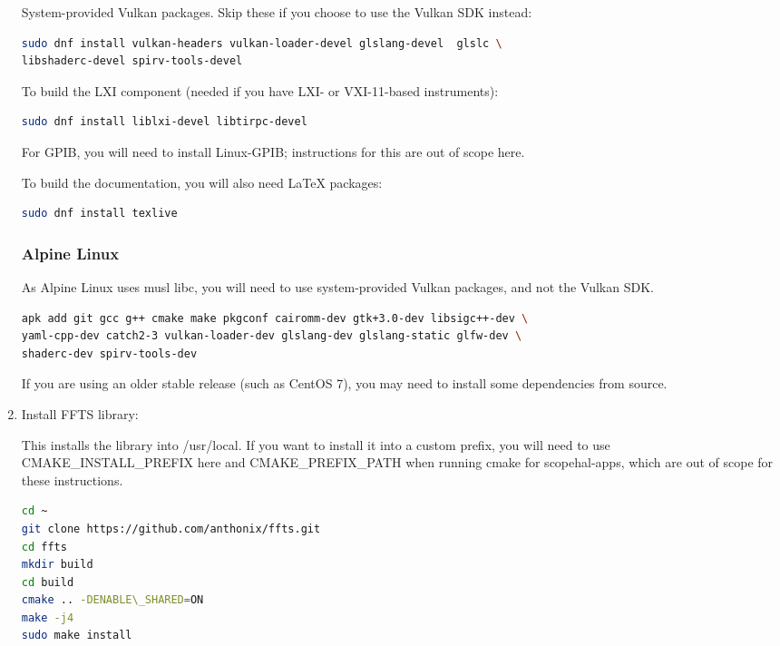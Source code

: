 \begin{enumerate}
System-provided Vulkan packages. Skip these if you choose to use the Vulkan SDK instead:
\begin{lstlisting}[language=sh, numbers=none]
sudo dnf install vulkan-headers vulkan-loader-devel glslang-devel  glslc \
libshaderc-devel spirv-tools-devel
\end{lstlisting}

To build the LXI component (needed if you have LXI- or VXI-11-based instruments):
\begin{lstlisting}[language=sh, numbers=none]
sudo dnf install liblxi-devel libtirpc-devel
\end{lstlisting}

For GPIB, you will need to install Linux-GPIB; instructions for this are out of scope here.

To build the documentation, you will also need LaTeX packages:
\begin{lstlisting}[language=sh, numbers=none]
sudo dnf install texlive
\end{lstlisting}

\subsubsection{Alpine Linux}

As Alpine Linux uses musl libc, you will need to use system-provided Vulkan packages, and not the Vulkan SDK.
\begin{lstlisting}[language=sh, numbers=none]
apk add git gcc g++ cmake make pkgconf cairomm-dev gtk+3.0-dev libsigc++-dev \
yaml-cpp-dev catch2-3 vulkan-loader-dev glslang-dev glslang-static glfw-dev \
shaderc-dev spirv-tools-dev
\end{lstlisting}

If you are using an older stable release (such as CentOS 7), you may need to install some dependencies from source.


\item Install FFTS library:

This installs the library into /usr/local. If you want to install it into a custom prefix, you will need to use
CMAKE\_INSTALL\_PREFIX here and CMAKE\_PREFIX\_PATH when running cmake for scopehal-apps, which are out of scope
for these instructions.

\begin{lstlisting}[language=sh, numbers=none]
cd ~
git clone https://github.com/anthonix/ffts.git
cd ffts
mkdir build
cd build
cmake .. -DENABLE\_SHARED=ON
make -j4
sudo make install
\end{lstlisting}


\end{enumerate}
